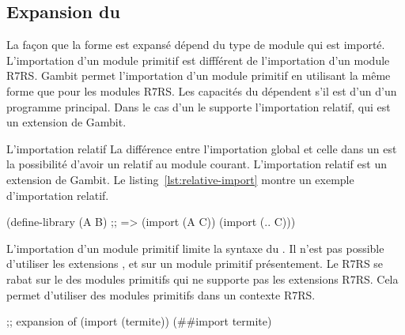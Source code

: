 \subsection{Expansion du }
\label{sec:import-expand}

La façon que la forme  est expansé dépend du type de module qui
est importé. L'importation d'un module primitif est diffférent de l'importation
d'un module R7RS. Gambit permet l'importation d'un module primitif en utilisant
la même forme que pour les modules R7RS. Les capacités du 
dépendent s'il est d'un  d'un programme principal. Dans
le cas d'un  le  supporte l'importation
relatif, qui est un extension de Gambit.

L'importation relatif La différence entre l'importation global et celle dans un
 est la possibilité d'avoir un  relatif
au module courant. L'importation relatif est un extension de Gambit. Le
listing~\ref{lst:relative-import} montre un exemple d'importation relatif.

\begin{center}
  \begin{mplisting}{0.8}
(define-library (A B)
  ;; => (import (A C))
  (import (.. C)))
\end{mplisting}
\end{center}

L'importation d'un module primitif limite la syntaxe du .
Il n'est pas possible d'utiliser les extensions , 
et  sur un module primitif présentement. Le  R7RS se rabat
sur le  des modules primitifs qui ne supporte pas les extensions R7RS.
Cela permet d'utiliser des modules primitifs dans un contexte R7RS.\\
\begin{center}
\begin{mplisting}{0.8}
;; expansion of (import (termite))
(##import termite)
\end{mplisting}
\end{center}

